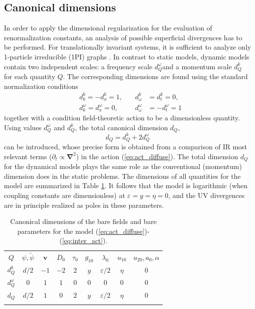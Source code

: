 \documentclass[aps,pre,url,twocolumn,superscriptaddress]{revtex4-1}
\def\eps{\varepsilon}
\def\mv{{\bm v}}
\def\boldnabla{{\bm \nabla}}
\begin{document}
\subsection{Canonical dimensions \label{sec:can_dim}}
In order to apply the dimensional regularization for the evaluation %
of renormalization constants, an analysis of possible superficial
divergences has to be performed.
For translationally invariant
systems, it  is sufficient to analyze only 1-particle irreducible (1PI)
graphs \cite{Zinn,Amit}.
In contrast to static models, dynamic models  \cite{Vasiliev,Tauber2014} 
contain two independent scales: a frequency scale 
 $d^\omega_Q $and a momentum scale $d^k_Q$ for each quantity $Q$.
The corresponding dimensions are found using the 
standard normalization conditions 
\begin{align}
  &  d_k^k = - d^k_x =1,\quad
  & d^k_\omega & = d_t^k = 0,\nonumber\\
  & d_k^\omega = d^\omega_x = 0,\quad
  & d^\omega_\omega & = -d_t^\omega = 1
  \label{eq:def_normal}
\end{align}
together with a condition field-theoretic action to be a dimensionless quantity.
Using values $d^\omega_Q$ and $d_Q^k$,
the total canonical dimension $d_Q$,
\begin{equation}
   d_Q = d_Q^k + 2d_Q^\omega
\end{equation}
can be introduced,
whose precise form is obtained from a comparison of IR most
relevant terms ($\partial_t \propto \boldnabla^2$) in the action (\ref{eq:act_diffuse}).
The total dimension $d_Q$ for the dynamical models
plays the same role as the conventional (momentum) dimension does in the static problems.
The dimensions of all quantities for the model are summarized in Table \ref{tab:canon}.
It follows that the model is logarithmic (when coupling constants
are dimensionless) at $\eps = y = \eta = 0$, and the UV divergences are
in principle realized as poles in these parameters.
\begin{table}
  \caption{Canonical dimensions of the bare fields and bare parameters 
	  for the model (\ref{eq:act_diffuse})-(\ref{eq:inter_act}).  }
  \label{tab:canon}
\begin{tabular}{| c | c | c | c | c| c | c | c | c | }
  \hline\noalign{\smallskip}
  $Q$ & $\psi,\tilde{\psi}$ & ${\mv}$ & $D_0$ & $\tau_0$ & $g_{10}$ & $\lambda_0 $  
  & $u_{10}$  & $u_{20},a_0,\alpha$
 \\  \noalign{\smallskip}\hline\noalign{\smallskip}
  $d_Q^k$ & $d/2$ & $-1$ & $-2$ & $2$ & $y$ & $\eps/2$
  & $\eta$  & $0$ 
  \\  \noalign{\smallskip}\hline\noalign{\smallskip}
  $d^\omega_Q$ & 0 & $1$ & $1$ & $0$ & $0$ & $0$
  & $0$  & $0$ 
  \\  \noalign{\smallskip}\hline\noalign{\smallskip}
  $d_Q$ & $d/2$ & $1$ & $0$ & $2$ & $y$ & $\eps/2$
  & $\eta$  & $0$ 
  \\ \noalign{\smallskip}\hline    
\end{tabular}
\end{table}
\end{document}
